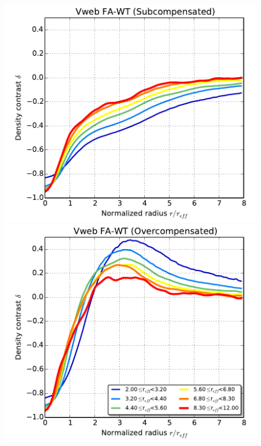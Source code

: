 \documentclass[a4,useAMS,usenatbib,usegraphicx]{mn2e}
\begin{document}
\begin{figure}
  \includegraphics[trim = 2mm 2mm 5mm 0mm, clip, keepaspectratio=true,
  width=0.35\textheight]{voids_density_VwebFAG0.pdf}
  \includegraphics[trim = 2mm 2mm 5mm 0mm, clip, keepaspectratio=true,
  width=0.35\textheight]{voids_density_VwebFAG1.pdf}

  \label{fig:density_profile}
  \vspace{0.1 cm}
\end{figure}
\end{document}
